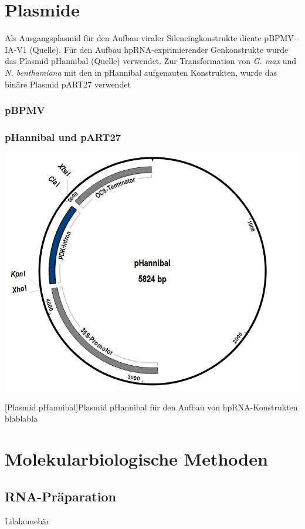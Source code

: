 \section{Plasmide}
Als Ausgangsplasmid für den Aufbau viraler Silencingkonstrukte diente pBPMV-IA-V1 (Quelle). Für den Aufbau  hpRNA-exprimierender Genkonstrukte wurde das Plasmid pHannibal (Quelle) verwendet. Zur Transformation von \textit{G. max} und \textit{N. benthamiana} mit den in pHannibal aufgenauten Konstrukten,  wurde das binäre Plasmid pART27 verwendet  

\subsubsection*{pBPMV}

\subsubsection*{pHannibal und pART27}
\begin{center}
\includegraphics[scale=.3]{MaterialMethoden/Abb/pHannibalgb1}
\end{center}
[Plasmid pHannibal]{Plasmid pHannibal für den Aufbau von hpRNA-Konstrukten\\ \footnotesize blablabla}
\par


\section{Molekularbiologische Methoden}
\subsection{RNA-Präparation}
Lilalaunebär